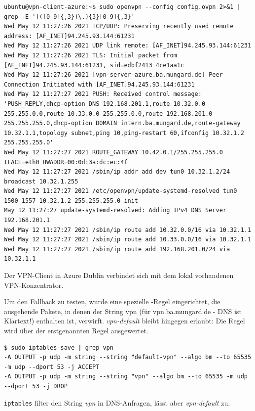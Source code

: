 \begin{listing}[h]
\begin{verbatim}
ubuntu@vpn-client-azure:~$ sudo openvpn --config config.ovpn 2>&1 | grep -E '(([0-9]{,3})\.){3}[0-9]{,3}'
Wed May 12 11:27:26 2021 TCP/UDP: Preserving recently used remote address: [AF_INET]94.245.93.144:61231
Wed May 12 11:27:26 2021 UDP link remote: [AF_INET]94.245.93.144:61231
Wed May 12 11:27:26 2021 TLS: Initial packet from [AF_INET]94.245.93.144:61231, sid=edbf2413 4ce1aa1c
Wed May 12 11:27:26 2021 [vpn-server-azure.ba.mungard.de] Peer Connection Initiated with [AF_INET]94.245.93.144:61231
Wed May 12 11:27:27 2021 PUSH: Received control message: 'PUSH_REPLY,dhcp-option DNS 192.168.201.1,route 10.32.0.0 255.255.0.0,route 10.33.0.0 255.255.0.0,route 192.168.201.0 255.255.255.0,dhcp-option DOMAIN intern.ba.mungard.de,route-gateway 10.32.1.1,topology subnet,ping 10,ping-restart 60,ifconfig 10.32.1.2 255.255.255.0'
Wed May 12 11:27:27 2021 ROUTE_GATEWAY 10.42.0.1/255.255.255.0 IFACE=eth0 HWADDR=00:0d:3a:dc:ec:4f
Wed May 12 11:27:27 2021 /sbin/ip addr add dev tun0 10.32.1.2/24 broadcast 10.32.1.255
Wed May 12 11:27:27 2021 /etc/openvpn/update-systemd-resolved tun0 1500 1557 10.32.1.2 255.255.255.0 init
May 12 11:27:27 update-systemd-resolved: Adding IPv4 DNS Server 192.168.201.1
Wed May 12 11:27:27 2021 /sbin/ip route add 10.32.0.0/16 via 10.32.1.1
Wed May 12 11:27:27 2021 /sbin/ip route add 10.33.0.0/16 via 10.32.1.1
Wed May 12 11:27:27 2021 /sbin/ip route add 192.168.201.0/24 via 10.32.1.1

\end{verbatim}
\caption{Der VPN-Client in Azure Dublin verbindet sich mit dem lokal vorhandenen VPN-Konzentrator.}
\label{openvpn-connect-log}
\end{listing}\FloatBarrier
\newpage
Um den Fallback zu testen, wurde eine spezielle -Regel eingerichtet, die ausgehende Pakete, in denen der String \glqq vpn\grqq{} (für vpn.ba.mungard.de - DNS ist Klartext!) enthalten ist, verwirft. \textit{vpn-default} bleibt hingegen erlaubt: Die Regel wird über der erstgenannten Regel ausgewertet.
\begin{listing}[h]
\begin{verbatim}
$ sudo iptables-save | grep vpn
-A OUTPUT -p udp -m string --string "default-vpn" --algo bm --to 65535 -m udp --dport 53 -j ACCEPT
-A OUTPUT -p udp -m string --string "vpn" --algo bm --to 65535 -m udp --dport 53 -j DROP

\end{verbatim}
\caption{\texttt{iptables} filter den String \textit{vpn} in DNS-Anfragen, lässt aber \textit{vpn-default} zu.}
\label{iptables-deny-string-dns}
\end{listing}\FloatBarrier
